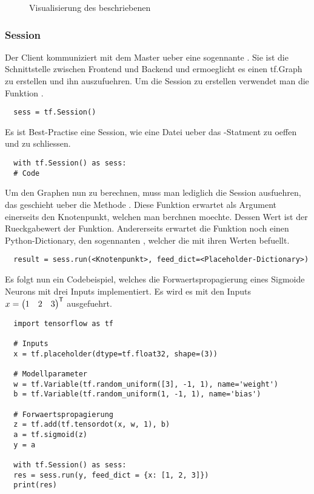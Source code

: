 \begin{figure}
  \caption{Visualisierung des beschriebenen }
\end{figure}
\para{}


\subsubsection{Session}
Der Client kommuniziert mit dem Master ueber eine sogennante
.
Sie ist die Schnittstelle zwischen Frontend und Backend und ermoeglicht es einen tf.Graph
zu erstellen und ihn auszufuehren.
Um die Session zu erstellen verwendet man die Funktion .
\begin{verbatim}
  sess = tf.Session()
\end{verbatim}
Es ist Best-Practise eine Session, wie eine Datei ueber das
-Statment zu oeffen und zu schliessen.
\begin{verbatim}
  with tf.Session() as sess:
  # Code
\end{verbatim}
\para{}
Um den Graphen nun zu berechnen, muss man lediglich die Session ausfuehren, das
geschieht ueber die Methode .
Diese Funktion erwartet als Argument einerseits den Knotenpunkt, welchen man
berchnen moechte. Dessen Wert ist der Rueckgabewert der Funktion.
Andererseits erwartet die Funktion noch einen Python-Dictionary, den sogennanten
, welcher die  mit ihren Werten befuellt.
\begin{verbatim}
  result = sess.run(<Knotenpunkt>, feed_dict=<Placeholder-Dictionary>)
\end{verbatim}
Es folgt nun ein Codebeispiel, welches die Forwaertspropagierung eines
Sigmoide Neurons mit drei Inputs implementiert. Es wird es mit den Inputs $x = \begin{pmatrix}1&2&3\end{pmatrix}^{\mathsf{T}}$ ausgefuehrt.
\begin{verbatim}
  import tensorflow as tf

  # Inputs
  x = tf.placeholder(dtype=tf.float32, shape=(3))

  # Modellparameter
  w = tf.Variable(tf.random_uniform([3], -1, 1), name='weight')
  b = tf.Variable(tf.random_uniform(1, -1, 1), name='bias')

  # Forwaertspropagierung
  z = tf.add(tf.tensordot(x, w, 1), b)
  a = tf.sigmoid(z)
  y = a

  with tf.Session() as sess:
  res = sess.run(y, feed_dict = {x: [1, 2, 3]})
  print(res)
\end{verbatim}

